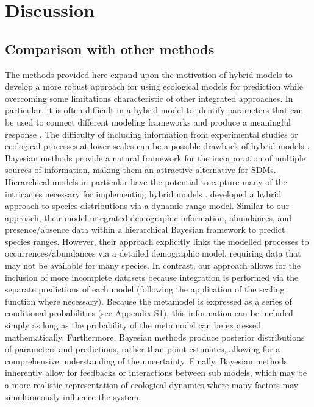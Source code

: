 \documentclass[11pt]{article}
\newcommand{\rev}[1]{{\color{RoyalBlue}#1}}
\begin{document}
%
%



\section*{Discussion}

\subsection*{Comparison with other methods}
The methods provided here expand upon the motivation of hybrid models to develop a more robust approach for using ecological models for prediction while overcoming some limitations characteristic of other integrated approaches.
In particular, it is often difficult in a hybrid model to identify parameters that can be used to connect different modeling frameworks and produce a meaningful response \citep{Thuiller2013}. 
The difficulty of including information from experimental studies or ecological processes at lower scales can be a possible drawback of hybrid models \citep{Smolik2010, Thuiller2014a}. 
\rev{Bayesian methods provide a natural framework for the incorporation of multiple sources of information, making them an attractive alternative for SDMs.
Hierarchical models in particular have the potential to capture many of the intricacies necessary for implementing hybrid models \citep{Latimer2006}.
\citet{Pagel2012} developed a hybrid approach to species distributions via a dynamic range model.
Similar to our approach, their model integrated demographic information, abundances, and presence/absence data within a hierarchical Bayesian framework to predict species ranges.
However, their approach explicitly links the modelled processes to occurrences/abundances via a detailed demographic model, requiring data that may not be available for many species.
In contrast, our approach allows for the inclusion of more incomplete datasets because integration is performed via the separate predictions of each model (following the application of the scaling function where necessary).}
Because the metamodel is expressed as a series of conditional probabilities (see Appendix S1), this information can be included simply as long as the probability of the metamodel can be expressed mathematically.
Furthermore, Bayesian methods produce posterior distributions of parameters and predictions, rather than point estimates, allowing for a comprehensive understanding of the uncertainty. 
Finally, Bayesian methods inherently allow for feedbacks or interactions between sub models, which may be a more realistic representation of ecological dynamics where many factors may simultaneously influence the system.
\end{document}
